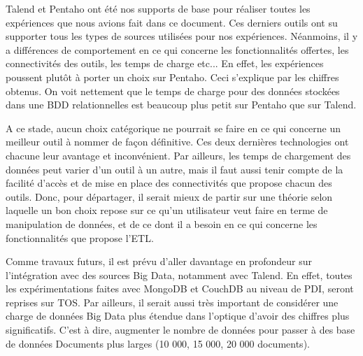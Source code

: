 \documentclass[12pt,a4wide,twoside]{report}
\begin{document}
Talend et Pentaho ont été nos supports de base pour réaliser toutes les expériences que nous avions fait dans ce document.
Ces derniers outils ont su supporter tous les types de sources utilisées pour nos expériences. Néanmoins, il y a différences de comportement en ce qui concerne les fonctionnalités offertes, les connectivités des outils, les temps de charge etc...\newline
En effet, les expériences poussent plutôt à porter un choix sur Pentaho. Ceci s'explique par les chiffres obtenus. On voit nettement que le temps de charge pour des données stockées dans une BDD relationnelles est beaucoup plus petit sur Pentaho que sur Talend.  


A ce stade, aucun choix catégorique ne pourrait se faire en ce qui concerne un meilleur outil à nommer de façon définitive. Ces deux dernières technologies ont chacune leur avantage et inconvénient. Par ailleurs, les temps de chargement des données peut varier d'un outil à un autre, mais il faut aussi tenir compte de la facilité d'accès et de mise en place des connectivités que propose chacun des outils. Donc, pour départager, il serait mieux de partir sur une théorie selon laquelle un bon choix repose sur ce qu'un utilisateur veut faire en terme de manipulation de données, et de ce dont il a besoin en ce qui concerne les fonctionnalités que propose l'ETL.


Comme travaux futurs, il est prévu d'aller davantage en profondeur sur l'intégration avec des sources Big Data, notamment avec Talend. En effet, toutes les expérimentations faites avec MongoDB et CouchDB au niveau de PDI, seront reprises sur TOS. Par ailleurs, il serait aussi très important de considérer une charge de données Big Data plus étendue dans l'optique d'avoir des chiffres plus significatifs. C'est à dire, augmenter le nombre de données pour passer à des base de données Documents plus larges (10 000, 15 000, 20 000 documents).


	
\end{document}
